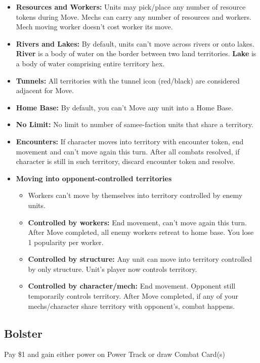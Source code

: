 \documentclass[12pt]{article}
\newenvironment{itemizeCustom}
{\begin{itemize}
  \setlength{\itemsep}{1pt}
  \setlength{\parskip}{0pt}
  \setlength{\parsep}{0pt}}
{\end{itemize}}
\begin{document}
\begin{multicols*}{2}
\begin{itemizeCustom}
    \item \textbf{Resources and Workers:} Units may pick/place any number of resource tokens during Move. Mechs can carry any number of resources and workers. Mech moving worker doesn't cost worker its move.
    \item \textbf{Rivers and Lakes:}  By default, units can't move across rivers or onto lakes. \textbf{River} is a body of water on the border between two land territories. \textbf{Lake} is a body of water comprising entire territory hex.
    \item \textbf{Tunnels:} All territories with the tunnel icon (red/black) are considered adjacent for Move.
    \item \textbf{Home Base:} By default, you can't Move any unit into a Home Base.
    \item \textbf{No Limit:} No limit to number of samee-faction units that share a territory.
    \item \textbf{Encounters:} If character moves into territory with encounter token, end movement and can't move again this turn. After all combats resolved, if character is still in such territory, discard encounter token and resolve.
    \item \textbf{Moving into opponent-controlled territories}
        \begin{itemizeCustom}
            \item Workers can't move by themselves into territory controlled by enemy units.
            \item \textbf{Controlled by workers:} End movement, can't move again this turn. After Move completed, all enemy workers retreat to home base. You lose 1 popularity per worker. 
            \item \textbf{Controlled by structure:} Any unit can move into territory controlled by only structure. Unit's player now controls territory.
            \item \textbf{Controlled by character/mech:} End movement. Opponent still temporarily controls territory. After Move completed, if any of your mechs/character share territory with opponent's, combat happens.
        \end{itemizeCustom}
\end{itemizeCustom}

\subsection*{Bolster}
Pay \$1 and gain either power on Power Track or draw Combat Card(s)


\end{multicols*}
\end{document}
